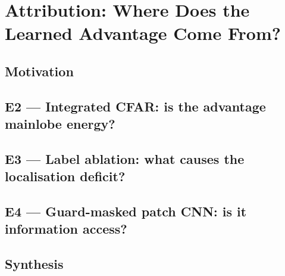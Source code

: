 \chapter{Attribution: Where Does the Learned Advantage Come From?}
\label{ch:attribution}

\section{Motivation}
\section{E2 --- Integrated CFAR: is the advantage mainlobe energy?}
\section{E3 --- Label ablation: what causes the localisation deficit?}
\section{E4 --- Guard-masked patch CNN: is it information access?}
\section{Synthesis}
